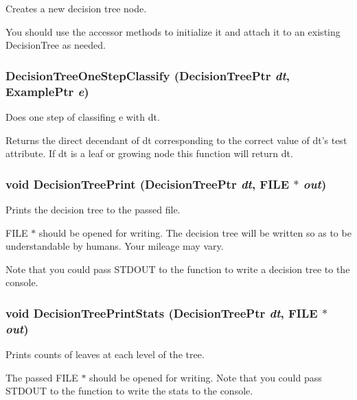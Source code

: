 Creates a new decision tree node. 

You should use the accessor methods to initialize it and attach it to an existing Decision\-Tree as needed. 
\subsubsection{ Decision\-Tree\-One\-Step\-Classify ({\bf Decision\-Tree\-Ptr} {\em dt}, {\bf Example\-Ptr} {\em e})}\label{DecisionTree_8h_a25}


Does one step of classifing e with dt. 

Returns the direct decendant of dt corresponding to the correct value of dt's test attribute. If dt is a leaf or growing node this function will return dt. 
\subsubsection{\setlength{\rightskip}{0pt plus 5cm}void Decision\-Tree\-Print ({\bf Decision\-Tree\-Ptr} {\em dt}, FILE $\ast$ {\em out})}\label{DecisionTree_8h_a33}


Prints the decision tree to the passed file. 

FILE $\ast$ should be opened for writing. The decision tree will be written so as to be understandable by humans. Your mileage may vary.

Note that you could pass STDOUT to the function to write a decision tree to the console. 
\subsubsection{\setlength{\rightskip}{0pt plus 5cm}void Decision\-Tree\-Print\-Stats ({\bf Decision\-Tree\-Ptr} {\em dt}, FILE $\ast$ {\em out})}\label{DecisionTree_8h_a34}


Prints counts of leaves at each level of the tree. 

The passed FILE $\ast$ should be opened for writing. Note that you could pass STDOUT to the function to write the stats to the console. 
